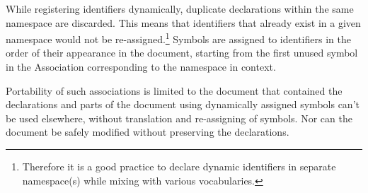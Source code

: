 While registering identifiers dynamically, duplicate declarations
within the same namespace are discarded. This means that identifiers that
already exist in a given namespace would not be
re-assigned.\footnote{Therefore it is a good practice to declare
  dynamic identifiers in separate namespace(s) while mixing with
  various vocabularies.} Symbols are assigned to identifiers in the
order of their appearance in the document, starting from the first
unused symbol in the Association corresponding to the namespace in
context.

Portability of such associations is limited to the document that
contained the declarations and parts of the document using dynamically
assigned symbols can't be used elsewhere, without translation and
re-assigning of symbols. Nor can the document be safely modified
without preserving the declarations.
